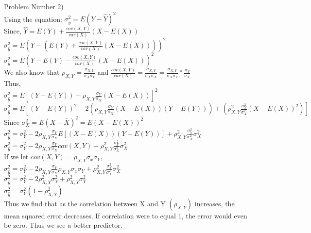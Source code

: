 \documentclass[11pt]{article}
\begin{document}
Problem Number 2)\\
Using the equation: $\sigma_{\hat{y}}^{2} = E(Y - \hat{Y})^{2}$\\
Since, $\hat{Y} = E(Y) + \frac{cov(X,Y)}{var(X)}(X - E(X))$\\
$\sigma_{\hat{y}}^{2} = E(Y - (E(Y) + \frac{cov(X,Y)}{var(X)}(X - E(X))))^{2}$\\
$\sigma_{\hat{y}}^{2} = E(Y - E(Y) - \frac{cov(X,Y)}{var(X)}(X - E(X)))^{2}$\\
We also know that $\rho_{X,Y} = \frac{\sigma_{X,Y}}{\sigma_{X} \sigma_{Y}}$ and $\frac{cov(X,Y)}{var(X)} = \frac{\sigma_{X,Y}}{\sigma_{X} \sigma_{X}} = \frac{\sigma_{X,Y}}{\sigma_{X} \sigma_{Y}} * \frac{\sigma_{Y}}{\sigma_{X}}$\\
Thus,\\
$\sigma_{\hat{y}}^{2} = E[(Y - E(Y)) - \rho_{X,Y} \frac{\sigma_{Y}}{\sigma_{X}} (X - E(X))]^{2}$\\
$\sigma_{\hat{y}}^{2} = E[(Y - E(Y))^{2} - 2(\rho_{X,Y} \frac{\sigma_{Y}}{\sigma_{X}} (X - E(X)) (Y - E(Y))) + (\rho_{X,Y}^{2} \frac{\sigma_{Y}^{2}}{\sigma_{X}^{2}} (X - E(X))^{2})]$\\
Since $\sigma_{X}^{2} = E(X - \bar{X})^{2} = E(X - E(X))^{2}$\\
$\sigma_{\hat{y}}^{2} = \sigma_{Y}^{2} - 2\rho_{X,Y} \frac{\sigma_{Y}}{\sigma_{X}} E[(X - E(X)) (Y - E(Y))] + \rho_{X,Y}^{2} \frac{\sigma_{Y}^{2}}{\sigma_{X}^{2}} \sigma_{X}^{2}$\\
$\sigma_{\hat{y}}^{2} = \sigma_{Y}^{2} - 2\rho_{X,Y} \frac{\sigma_{Y}}{\sigma_{X}} cov(X,Y) + \rho_{X,Y}^{2} \frac{\sigma_{Y}^{2}}{\sigma_{X}^{2}} \sigma_{X}^{2}$\\
If we let $cov(X,Y) = \rho_{X,Y} \sigma_{x} \sigma_{Y}$,\\
$\sigma_{\hat{y}}^{2} = \sigma_{Y}^{2} - 2\rho_{X,Y} \frac{\sigma_{Y}}{\sigma_{X}} \rho_{X,Y} \sigma_{x} \sigma_{Y} + \rho_{X,Y}^{2} \frac{\sigma_{Y}^{2}}{\sigma_{X}^{2}} \sigma_{X}^{2}$\\
$\sigma_{\hat{y}}^{2} = \sigma_{Y}^{2} - 2\rho_{X,Y}^{2} \sigma_{Y}^{2} + \rho_{X,Y}^{2} \sigma_{Y}^{2}$\\
$\sigma_{\hat{y}}^{2} = \sigma_{Y}^{2} (1 - \rho_{X,Y}^{2})$\\
Thus we find that as the correlation between X and Y $(\rho_{X,Y})$ increases, the mean squared error decreases. If correlation were to equal 1, the error would even be zero. Thus we see a better predictor.\\
\end{document}
